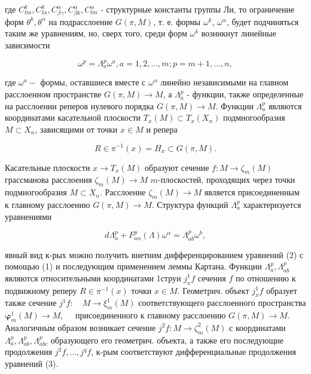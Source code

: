 \documentclass[10pt]{article}
\begin{document}
где $C_{l m}^{k}, C_{l \alpha}^{k}, C_{\beta \gamma}^{\alpha}, C_{\beta k}^{\alpha}, C_{l m}^{\alpha}$ - структурные константы группы Ли, то ограничение форм $\theta^{k}, \theta^{\alpha}$ на подрасслоение $G(\pi, M)$, т. е. формы $\omega^{k}$, $\omega^{\alpha}$, будет подчиняться таким же уравнениям, но, сверх того, среди форм $\omega^{k}$ возникнут линейные зависимости



\[

\omega^{p}=\Lambda_{a}^{p} \omega^{a}, a=1,2, \ldots, m ; p=m+1, \ldots, n,

\]



где $\omega^{a}-$ формы, оставшиеся вместе с $\omega^{\alpha}$ линейно независимыми на главном расслоенном пространстве $G(\pi, M) \rightarrow M$, а $\Lambda_{a}^{p}$ - функции, также определенные на расслоении реперов нулевого порядка $G(\pi, M) \rightarrow M$. Функции $\Lambda_{a}^{p}$ являются координатами касательной плоскости $T_{x}(M) \subset T_{x}\left(X_{n}\right)$ подмногообразия $M \subset X_{n}$, зависящими от точки $x \in M$ и репера



\[

R \in \pi^{-1}(x)=H_{x} \subset G(\pi, M) .

\]



Касательные плоскости $x \rightarrow T_{x}(M)$ образуют сечение $f: M \rightarrow \zeta_{m}(M)$ грассманова расслоения $\mathscr{\zeta}_{m}(M) \rightarrow M$ $m$-плоскостей, проходящих через точки подмногообразия $M \subset X_{n}$. Расслоение $\mathscr{\zeta}_{m}(M) \rightarrow M$ является присоединенным к главному расслоению $G(\pi, M) \rightarrow M$. Структура функций $\Lambda_{a}^{p}$ характеризуется уравнениями



\[

d \Lambda_{a}^{p}+F_{a \alpha}^{p}(\Lambda) \omega^{\alpha}=\Lambda_{a b}^{p} \omega^{b},

\]



явный вид к-рых можно получить внетним дифференцированием уравнений (2) с помощью (1) и последующим применением леммы Картана. Функции $\Lambda_{a}^{p}, \Lambda_{a b}^{p}$ являются относительными координатами 1струи $j_{x}^{1} f$ сечения $f$ по отношению к подвижному реперу $R \in \pi^{-1}(x)$ точки $x \in M$. Геометрич. объект $j_{x}^{1} f$ образует также сечение $j^{1} f: \quad M \rightarrow \xi_{m}^{1}(M)$ соответствующего расслоенного пространства $\boldsymbol{\varphi}_{m}^{1}(M) \rightarrow M, \quad$ присоединенного к главному расслоению $G(\pi, M) \rightarrow M$. Аналогичным образом возникает сечение $j^{2} f: M \rightarrow \zeta_{m}^{2}(M)$ с координатами $\Lambda_{a}^{p}, \Lambda_{a b}^{p}, \Lambda_{a b c}^{p}$ образующего его геометрич. объекта, а также его последующие продолжения $j^{3} f, \ldots, j^{q} f$, к-рым соответствуют дифференциальные продолжения уравнений (3).
\end{document}
